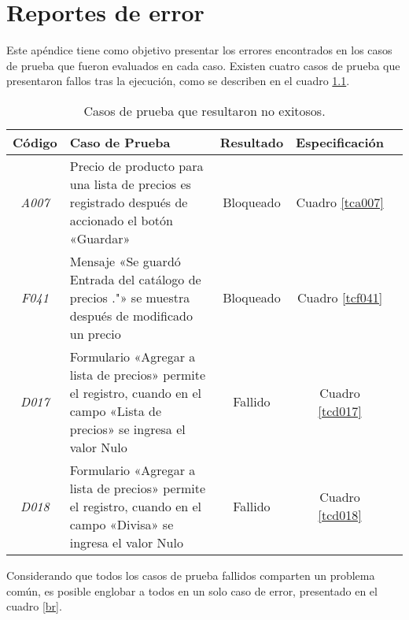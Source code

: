 \chapter{Reportes de error}\label{appendix_bugreport}
Este apéndice tiene como objetivo presentar los errores encontrados en los casos
de prueba que fueron evaluados en cada caso. Existen cuatro casos de prueba que
presentaron fallos tras la ejecución, como se describen en el cuadro
\ref{bugs}.

\begin{table}[H]
\centering
\begin{tabular}{|c|p{6.5cm}|c|c|c|}
\hline
\footnotesize{\textbf{Código}} & \footnotesize{\textbf{Caso de Prueba}} &
\footnotesize{\textbf{Resultado}} & \footnotesize{\textbf{Especificación}} \\
\hline
\footnotesize{\emph{A007}} &
\footnotesize{Precio de producto para una lista de precios es registrado después
de accionado el botón «Guardar»} &
\footnotesize{Bloqueado} &
\footnotesize{Cuadro \ref{tca007}}
\\
\footnotesize{\emph{F041}} &
\footnotesize{Mensaje «Se guardó Entrada del catálogo de precios ."» se muestra
después de modificado un precio} &
\footnotesize{Bloqueado} &
\footnotesize{Cuadro \ref{tcf041}}
\\
\footnotesize{\emph{D017}} &
\footnotesize{Formulario «Agregar a lista de precios» permite el registro,
cuando en el campo «Lista de precios» se ingresa el valor Nulo} &
\footnotesize{Fallido} &
\footnotesize{Cuadro \ref{tcd017}}
\\
\footnotesize{\emph{D018}} &
\footnotesize{Formulario «Agregar a lista de precios» permite el registro,
cuando en el campo «Divisa» se ingresa el valor Nulo} &
\footnotesize{Fallido} &
\footnotesize{Cuadro \ref{tcd018}}
\\
\hline
\end{tabular}
\caption{Casos de prueba que resultaron no exitosos.}
\label{bugs}
\end{table}

Considerando que todos los casos de prueba fallidos comparten un problema común,
es posible englobar a todos en un solo caso de error, presentado en el cuadro
\ref{br}.

